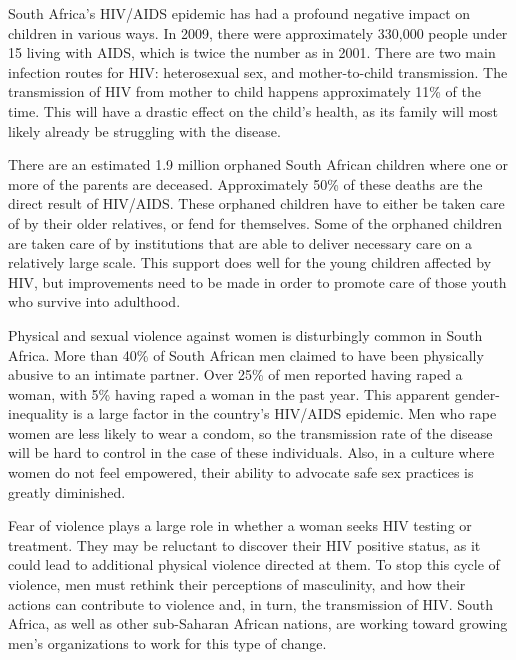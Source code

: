 \documentclass[12pt]{report}
\begin{document}
South Africa's HIV/AIDS epidemic has had a profound negative impact on children in various ways.  
In 2009, there were approximately 330,000 people under 15 living with AIDS, which is twice the number as in 2001.
There are two main infection routes for HIV: heterosexual sex, and mother-to-child transmission.  The transmission of HIV from mother to child happens approximately 11\% of the time.
This will have a drastic effect on the child's health, as its family will most likely already be struggling with the disease\cite{avert}.

There are an estimated 1.9 million orphaned South African children where one or more of the parents are deceased.
Approximately 50\% of these deaths are the direct result of HIV/AIDS\cite{avert}.
These orphaned children have to either be taken care of by their older relatives, or fend for themselves.
Some of the orphaned children are taken care of by institutions that are able to deliver necessary care on a relatively large scale.
This support does well for the young children affected by HIV, but improvements need to be made in order to promote care of those youth who survive into adulthood.

Physical and sexual violence against women is disturbingly common in South Africa. 
More than 40\% of South African men claimed to have been physically abusive to an intimate partner.
Over 25\% of men reported having raped a woman, with 5\% having raped a woman in the past year\cite{avert}.
This apparent gender-inequality is a large factor in the country's HIV/AIDS epidemic.  
Men who rape women are less likely to wear a condom, so the transmission rate of the disease will be hard to control in the case of these individuals.
Also, in a culture where women do not feel empowered, their ability to advocate safe sex practices is greatly diminished.

Fear of violence plays a large role in whether a woman seeks HIV testing or treatment.  
They may be reluctant to discover their HIV positive status, as it could lead to additional physical violence directed at them.
To stop this cycle of violence, men must rethink their perceptions of masculinity, and how their actions can contribute to violence and, in turn, the transmission of HIV.
South Africa, as well as other sub-Saharan African nations, are working toward growing men's organizations to work for this type of change\cite{eldis}.
\end{document}
